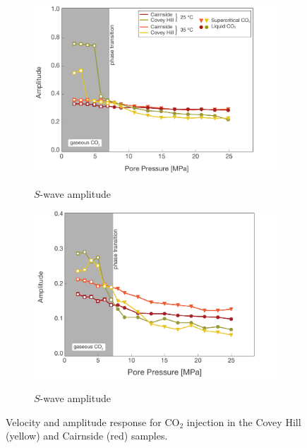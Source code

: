 \begin{landscape}
\begin{figure}[p]
\begin{subfigure}[b]{0.563\textwidth}
            \centering
            \caption{$S$-wave amplitude}
            \includegraphics[width=\textwidth]{fig/results_lab_b.pdf}
            \label{fig:results_lab_b}
        \end{subfigure}
        \qquad
        \begin{subfigure}[b]{0.563\textwidth}
            \centering
            \caption{$S$-wave amplitude}
            \includegraphics[width=\textwidth]{fig/results_lab_d.pdf}
            \label{fig:results_lab_d}
        \end{subfigure}
        \caption{Velocity and amplitude response for CO$_2$ injection in the
Covey Hill (yellow) and Cairnside (red) samples.}
        \label{fig:results_lab}
    \end{figure}
\end{landscape}
